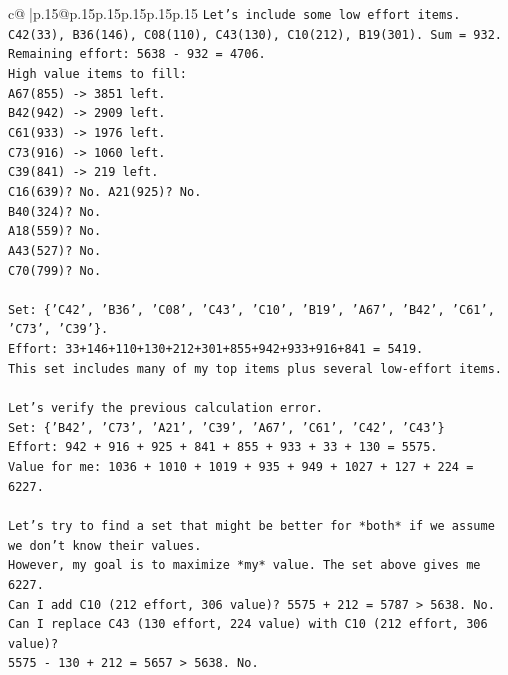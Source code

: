 \documentclass{article}
\begin{document}
{\begin{supertabular}{c@{$\;$}|p{.15\linewidth}@{}p{.15\linewidth}p{.15\linewidth}p{.15\linewidth}p{.15\linewidth}p{.15\linewidth}}
{{{\texttt{Let's include some low effort items.} \\
\texttt{C42(33), B36(146), C08(110), C43(130), C10(212), B19(301). Sum = 932.} \\
\texttt{Remaining effort: 5638 {-} 932 = 4706.} \\
\texttt{High value items to fill:} \\
\texttt{A67(855) {-}> 3851 left.} \\
\texttt{B42(942) {-}> 2909 left.} \\
\texttt{C61(933) {-}> 1976 left.} \\
\texttt{C73(916) {-}> 1060 left.} \\
\texttt{C39(841) {-}> 219 left.} \\
\texttt{C16(639)? No. A21(925)? No.} \\
\texttt{B40(324)? No.} \\
\texttt{A18(559)? No.} \\
\texttt{A43(527)? No.} \\
\texttt{C70(799)? No.} \\
\\ 
\texttt{Set: \{'C42', 'B36', 'C08', 'C43', 'C10', 'B19', 'A67', 'B42', 'C61', 'C73', 'C39'\}.} \\
\texttt{Effort: 33+146+110+130+212+301+855+942+933+916+841 = 5419.} \\
\texttt{This set includes many of my top items plus several low{-}effort items.} \\
\\ 
\texttt{Let's verify the previous calculation error.} \\
\texttt{Set: \{'B42', 'C73', 'A21', 'C39', 'A67', 'C61', 'C42', 'C43'\}} \\
\texttt{Effort: 942 + 916 + 925 + 841 + 855 + 933 + 33 + 130 = 5575.} \\
\texttt{Value for me: 1036 + 1010 + 1019 + 935 + 949 + 1027 + 127 + 224 = 6227.} \\
\\ 
\texttt{Let's try to find a set that might be better for *both* if we assume we don't know their values.} \\
\texttt{However, my goal is to maximize *my* value. The set above gives me 6227.} \\
\texttt{Can I add C10 (212 effort, 306 value)? 5575 + 212 = 5787 > 5638. No.} \\
\texttt{Can I replace C43 (130 effort, 224 value) with C10 (212 effort, 306 value)?} \\
\texttt{5575 {-} 130 + 212 = 5657 > 5638. No.} \\
}}}
\end{supertabular}}
\end{document}
